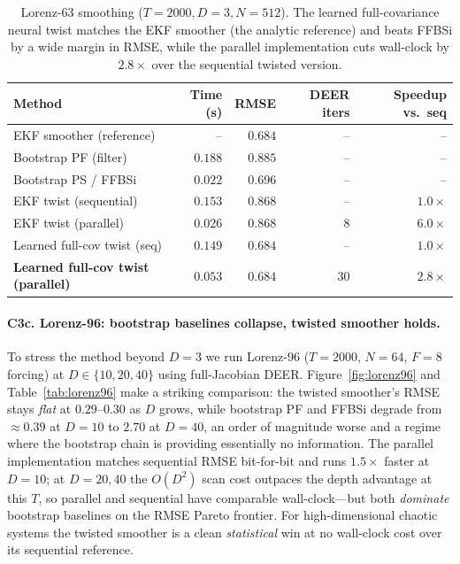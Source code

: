 \documentclass{article}
\begin{document}
\begin{table}[t]
\caption{Lorenz-63 smoothing ($T=2000, D=3, N=512$). The learned full-covariance neural twist matches the EKF smoother (the analytic reference) and beats FFBSi by a wide margin in RMSE, while the parallel implementation cuts wall-clock by $2.8\times$ over the sequential twisted version.}
\label{tab:lorenz63}
\centering
\small
\begin{tabular}{lrrrr}
\toprule
Method & Time (s) & RMSE & DEER iters & Speedup vs.\ seq \\
\midrule
EKF smoother (reference)        & --        & $0.684$ & --   & --     \\
Bootstrap PF (filter)           & $0.188$   & $0.885$ & --   & --     \\
Bootstrap PS / FFBSi            & $0.022$   & $0.696$ & --   & --     \\
EKF twist (sequential)          & $0.153$   & $0.868$ & --   & $1.0\times$ \\
EKF twist (parallel)            & $0.026$   & $0.868$ & $8$  & $\mathbf{6.0\times}$ \\
Learned full-cov twist (seq)    & $0.149$   & $0.684$ & --   & $1.0\times$ \\
\textbf{Learned full-cov twist (parallel)} & $\mathbf{0.053}$ & $\mathbf{0.684}$ & $30$ & $\mathbf{2.8\times}$ \\
\bottomrule
\end{tabular}
\end{table}

\paragraph{C3c. Lorenz-96: bootstrap baselines collapse, twisted smoother holds.} To stress the method beyond $D=3$ we run Lorenz-96 ($T=2000$, $N=64$, $F=8$ forcing) at $D \in \{10, 20, 40\}$ using full-Jacobian DEER. Figure~\ref{fig:lorenz96} and Table~\ref{tab:lorenz96} make a striking comparison: the twisted smoother's RMSE stays \emph{flat} at $0.29$--$0.30$ as $D$ grows, while bootstrap PF and FFBSi degrade from $\approx 0.39$ at $D=10$ to $2.70$ at $D=40$, an order of magnitude worse and a regime where the bootstrap chain is providing essentially no information. The parallel implementation matches sequential RMSE bit-for-bit and runs $1.5\times$ faster at $D=10$; at $D=20, 40$ the $O(D^2)$ scan cost outpaces the depth advantage at this $T$, so parallel and sequential have comparable wall-clock---but both \emph{dominate} bootstrap baselines on the RMSE Pareto frontier. For high-dimensional chaotic systems the twisted smoother is a clean \emph{statistical} win at no wall-clock cost over its sequential reference.
\end{document}

